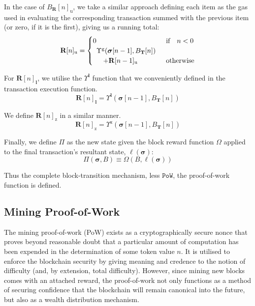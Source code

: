 \documentclass[9pt,oneside]{amsart}
\begin{document}
\begin{multicols}{2}
In the case of $B_{\mathbf{R}}[n]_{\mathrm{u}}$, we take a similar approach defining each item as the gas used in evaluating the corresponding transaction summed with the previous item (or zero, if it is the first), giving us a running total:
\begin{equation}
\mathbf{R}[n]_{\mathrm{u}} = \begin{cases} 0 & \text{if} \quad n < 0 \\
\begin{array}[b]{l}
\Upsilon^{\mathrm{g}}(\boldsymbol{\sigma}[n - 1], B_{\mathbf{T}}[n])\\ \quad + \mathbf{R}[n-1]_{\mathrm{u}}
\end{array}
 & \text{otherwise} \end{cases}
\end{equation}

For $\mathbf{R}[n]_{\mathbf{l}}$, we utilise the $\Upsilon^\mathbf{l}$ function that we conveniently defined in the transaction execution function.
\begin{equation}
\mathbf{R}[n]_{\mathbf{l}} =
\Upsilon^{\mathbf{l}}(\boldsymbol{\sigma}[n - 1], B_{\mathbf{T}}[n])
\end{equation}

We define $\mathbf{R}[n]_{\mathrm{z}}$ in a similar manner.
\begin{equation}
\mathbf{R}[n]_{\mathrm{z}} =
\Upsilon^{\mathrm{z}}(\boldsymbol{\sigma}[n - 1], B_{\mathbf{T}}[n])
\end{equation}

\hypertarget{Pi}{}Finally, we define $\Pi$ as the new state given the block reward function $\Omega$ applied to the final transaction's resultant state, $\ell(\boldsymbol{\sigma})$:
\begin{equation}
\Pi(\boldsymbol{\sigma}, B) \equiv \Omega(B, \ell(\boldsymbol{\sigma}))
\end{equation}

Thus the complete block-transition mechanism, less $\mathtt{PoW}$, the proof-of-work function is defined.

\subsection{Mining Proof-of-Work} \label{ch:pow}

The mining proof-of-work (PoW) exists as a cryptographically secure nonce that proves beyond reasonable doubt that a particular amount of computation has been expended in the determination of some token value $n$. It is utilised to enforce the blockchain security by giving meaning and credence to the notion of difficulty (and, by extension, total difficulty). However, since mining new blocks comes with an attached reward, the proof-of-work not only functions as a method of securing confidence that the blockchain will remain canonical into the future, but also as a wealth distribution mechanism.


\end{multicols}
\end{document}
